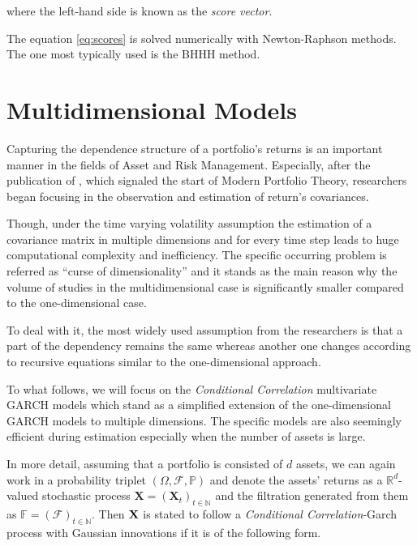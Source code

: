 \documentclass[a4paper, oneside]{discothesis}
\begin{document}
where the left-hand side is known as the \textit{score vector}.  

The equation \ref{eq:scores} is solved numerically with Newton-Raphson methods. The one most typically used is the BHHH \cite{bhhh} method.

\section{Multidimensional Models}

Capturing the dependence structure of a portfolio's returns is an important manner in the fields of Asset and Risk Management. Especially, after the publication of \cite{MPT}, which signaled the start of Modern Portfolio Theory, researchers began focusing in the observation and estimation of return's covariances. 

Though, under the time varying volatility assumption the estimation of a covariance matrix in multiple dimensions and for every time step leads to huge computational complexity and inefficiency. The specific occurring problem is referred as ``curse of dimensionality'' and it stands as the main reason why the volume of studies in the multidimensional case is significantly smaller compared to the one-dimensional case.

To deal with it, the most widely used assumption from the researchers is that a part of the dependency remains the same whereas another one changes according to recursive equations similar to the one-dimensional approach.

To what follows, we will focus on the \textit{Conditional Correlation} multivariate GARCH models which stand as a simplified extension of the one-dimensional GARCH models to multiple dimensions. The specific models are also seemingly efficient during estimation especially when the number of assets is large.

In more detail, assuming that a portfolio is consisted of $d$ assets, we can again work in a probability triplet $(\Omega, \mathcal{F}, \mathbb{P})$ and denote the assets' returns as a $\mathbb{R}^d$-valued stochastic process $\mathbf{X} = (\mathbf{X}_t)_{t\in\mathbb{N}}$ and the filtration generated from them as $\mathbb{F} = (\mathcal{F})_{t\in\mathbb{N}}$. Then $\bf{X}$ is stated to follow a \textit{Conditional Correlation}-Garch process with Gaussian innovations if it is of the following form.
\end{document}
